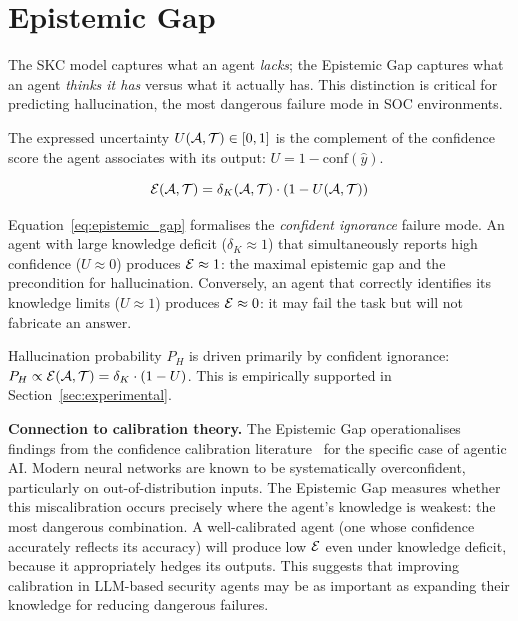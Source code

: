 \section{Epistemic Gap}
\label{sec:epistemic}

The SKC model captures what an agent \textit{lacks}; the Epistemic Gap
captures what an agent \textit{thinks it has} versus what it actually has.
This distinction is critical for predicting hallucination, the most
dangerous failure mode in SOC environments.

\begin{definition}
  The expressed uncertainty $U(\mathcal{A}, \mathcal{T}) \in [0,1]$ is the complement of
  the confidence score the agent associates with its output:
  $U = 1 - \mathrm{conf}(\hat{y})$.
\end{definition}

\begin{definition}
  \begin{equation}
    \mathcal{E}(\mathcal{A}, \mathcal{T}) = \delta_K(\mathcal{A}, \mathcal{T}) \cdot (1 - U(\mathcal{A}, \mathcal{T}))
    \label{eq:epistemic_gap}
  \end{equation}
\end{definition}

Equation~\eqref{eq:epistemic_gap} formalises the \textit{confident ignorance}
failure mode. An agent with large knowledge deficit ($\delta_K \approx 1$)
that simultaneously reports high confidence ($U \approx 0$) produces
$\mathcal{E} \approx 1$: the maximal epistemic gap and the precondition for
hallucination. Conversely, an agent that correctly identifies its knowledge
limits ($U \approx 1$) produces $\mathcal{E} \approx 0$: it may fail the task but
will not fabricate an answer.

\begin{hypothesis}
\label{hyp:hallucination}
  Hallucination probability $P_H$ is driven primarily by confident ignorance:
  $P_H \propto \mathcal{E}(\mathcal{A}, \mathcal{T}) = \delta_K \cdot (1 - U)$. This is empirically
  supported in Section~\ref{sec:experimental}.
\end{hypothesis}

\textbf{Connection to calibration theory.}
The Epistemic Gap operationalises findings from the confidence calibration
literature~\cite{guo2017calibration} for the specific case of agentic AI.
Modern neural networks are known to be systematically overconfident,
particularly on out-of-distribution inputs. The Epistemic Gap measures
whether this miscalibration occurs precisely where the agent's knowledge
is weakest: the most dangerous combination. A well-calibrated agent (one
whose confidence accurately reflects its accuracy) will produce low
$\mathcal{E}$ even under knowledge deficit, because it appropriately hedges its
outputs. This suggests that improving calibration in LLM-based security
agents may be as important as expanding their knowledge for reducing
dangerous failures.

